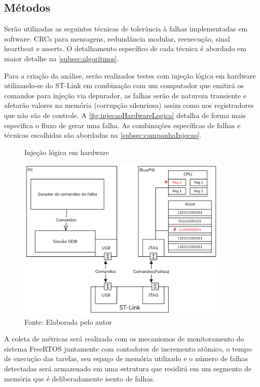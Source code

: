 \subsection{Métodos}

Serão utilizadas as seguintes técnicas de tolerância à falhas implementadas em software: CRCs para mensagens, redundância modular, reexecução, sinal heartbeat e asserts. O detalhamento específico de cada técnica é abordado em maior detalhe na \autoref{subsec:algoritmos}.

Para a criação da análise, serão realizados testes com injeção lógica em hardware utilizando-se do ST-Link em combinação com um computador que emitirá os comandos para injeção via depurador, as falhas serão de natureza transiente e afetarão valores na memória (corrupção silenciosa) assim como nos registradores que não são de controle. A \autoref{fig:injecaoHardwareLogica} detalha de forma mais específica o fluxo de gerar uma falha. As combinações específicas de falhas e técnicas escolhidas são abordadas na \autoref{subsec:campanhaInjecao}.

\begin{figure}[H]
   \centering
   \captionsetup{justification=centering}
   \caption{Injeção lógica em hardware}
   \includegraphics[width=0.90\textwidth]{assets/injecao_hardware.png}
   \captionsetup{justification=raggedright}
  \caption*{Fonte: Elaborada pelo autor}
   \label{fig:injecaoHardwareLogica}
\end{figure}

A coleta de métricas será realizada com os mecanismos de monitoramento do sistema FreeRTOS juntamente com contadores de incremento atômico, o tempo de execução das tarefas, seu espaço de memória utilizado e o número de falhas detectadas será armazenado em uma estrutura que residirá em um segmento de memória que é deliberadamente isento de falhas.

